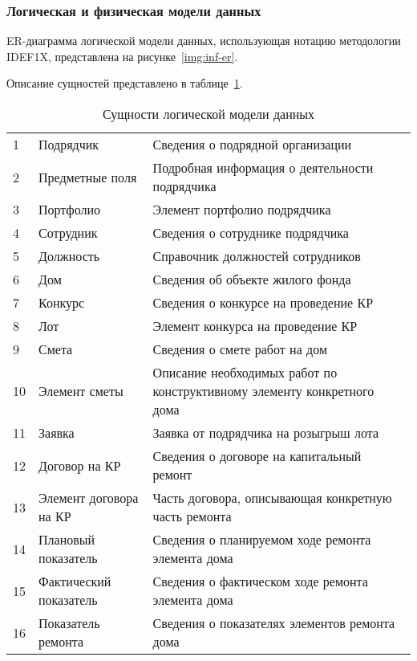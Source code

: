 \subsubsection{Логическая и физическая модели данных}

ER-диаграмма логической модели данных, использующая нотацию методологии IDEF1X, представлена на рисунке~\ref{img:inf-er}.


Описание сущностей представлено в таблице~\ref{tab:inf-entities}.

\begin{footnotesize}
\begin{longtable}[h]{|p{}|p{}|p{}|}
	\caption{\label{tab:inf-entities}Сущности логической модели данных} \\
	\hline
		\thead{№} &
		\thead{Название сущности} &
		\thead{Описание} \\
	\hline \endhead
		1 & Подрядчик & Сведения о подрядной организации \\ \hline
		2 & Предметные поля & Подробная информация о деятельности подрядчика \\ \hline
		3 & Портфолио & Элемент портфолио подрядчика \\ \hline
		4 & Сотрудник & Сведения о сотруднике подрядчика \\ \hline
		5 & Должность & Справочник должностей сотрудников \\ \hline
		6 & Дом & Сведения об объекте жилого фонда \\ \hline
		7 & Конкурс & Сведения о конкурсе на проведение КР \\ \hline
		8 & Лот & Элемент конкурса на проведение КР \\ \hline
		9 & Смета & Сведения о смете работ на дом \\ \hline
		10 & Элемент сметы & Описание необходимых работ по конструктивному элементу конкретного дома \\ \hline
		11 & Заявка & Заявка от подрядчика на розыгрыш лота \\ \hline
		12 & Договор на КР & Сведения о договоре на капитальный ремонт \\ \hline
		13 & Элемент договора на КР & Часть договора, описывающая конкретную часть ремонта \\ \hline
		14 & Плановый показатель & Сведения о планируемом ходе ремонта элемента дома \\ \hline
		15 & Фактический показатель & Сведения о фактическом ходе ремонта элемента дома \\ \hline
		16 & Показатель ремонта & Сведения о показателях элементов ремонта дома \\ \hline
\end{longtable}
\end{footnotesize}

